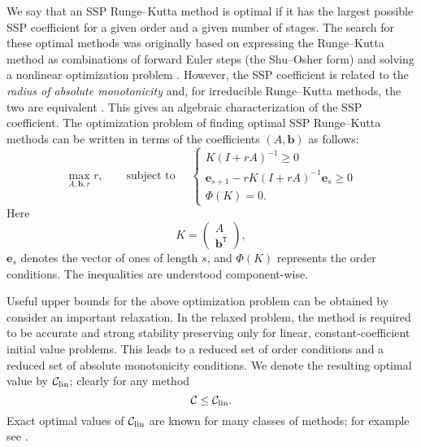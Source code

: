 We say that an SSP Runge--Kutta method is optimal if it has the largest possible SSP coefficient for a given order and a given number of stages.
The search for these optimal methods was originally based on expressing the Runge--Kutta method as combinations of forward Euler steps (the Shu--Osher form) and solving a nonlinear optimization problem \cite{Gottlieb1998, Gottlieb2001, Spiteri2003a, Spiteri2003b, Ruuth2004}.
However, the SSP coefficient is related to the \emph{radius of absolute monotonicity} \cite{Kraaijevanger1991} and, for irreducible Runge--Kutta methods, the two are equivalent \cite{Ferracina2004, Higueras2004}.
This gives an algebraic characterization of the SSP coefficient.
The optimization problem of finding optimal SSP Runge--Kutta methods
can be written in terms of the coefficients $(A,\bm{b})$ as
follows:
\begin{equation}\label{eq:SSP_opt}
    \max_{A, \bm{b}, r} r, \qquad \text{subject to } \quad \left\{
                                                 \begin{array}{ll}
                                                   K(I + rA)^{-1} \geq 0 \\
                                                   \bm{e}_{s+1} - rK(I + rA)^{-1}\bm{e}_{s} \geq 0 \\
                                                   \Phi(K) = 0.
                                                 \end{array}
                                               \right.
\end{equation}
Here
\begin{equation*}
    K = \left(
            \begin{array}{c}
                     A              \\
                     \bm{b}^{\texttt{T}}
            \end{array}
         \right),
\end{equation*}
$\bm{e}_s$ denotes the vector of ones of length $s$,
and \( \Phi(K) \) represents the  order conditions.
The inequalities are understood component-wise.

Useful upper bounds for the above optimization problem can be obtained by consider an important relaxation. 
In the relaxed problem, the method is required to be accurate and strong stability preserving only for linear, constant-coefficient initial value problems. 
This leads to a reduced set of order conditions and a reduced set of absolute monotonicity conditions.
We denote the resulting optimal value by $\mathcal{C}_{\text{lin}}$; clearly for any method
\begin{equation*}
	\mathcal{C}\le\mathcal{C}_{\text{lin}}.
\end{equation*}
Exact optimal values of $\mathcal{C}_{\text{lin}}$ are known for many classes of methods; for example see \cite{Kraaijevanger1986,ketcheson2009a}.

